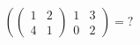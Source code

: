 \documentclass{article}
\begin{document}
\[ \left(
\left(
\begin{array}{cc}
1 & 2 \\ 
4 & 1
\end{array} \right)
\begin{array}{cc}
1 & 3 \\ 
0 & 2
\end{array} \right) = ? \]
\end{document}
